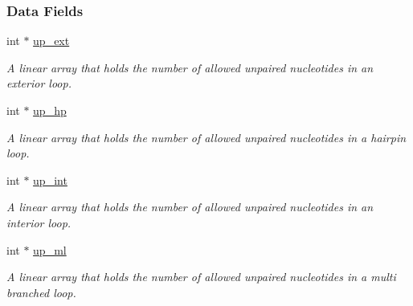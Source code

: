 \subsubsection*{Data Fields}
\begin{DoxyCompactItemize}
\item 
\mbox{\label{group__hard__constraints_a60094038af04093b2fee9b883266ff75}} 
int $\ast$ \hyperlink{group__hard__constraints_a60094038af04093b2fee9b883266ff75}{up\+\_\+ext}
\begin{DoxyCompactList}\small\item\em A linear array that holds the number of allowed unpaired nucleotides in an exterior loop. \end{DoxyCompactList}\item 
\mbox{\label{group__hard__constraints_a853255558e7e7d9eb382ac142ac8de3d}} 
int $\ast$ \hyperlink{group__hard__constraints_a853255558e7e7d9eb382ac142ac8de3d}{up\+\_\+hp}
\begin{DoxyCompactList}\small\item\em A linear array that holds the number of allowed unpaired nucleotides in a hairpin loop. \end{DoxyCompactList}\item 
\mbox{\label{group__hard__constraints_a455f994af0ec892d84fee1bf60d14a81}} 
int $\ast$ \hyperlink{group__hard__constraints_a455f994af0ec892d84fee1bf60d14a81}{up\+\_\+int}
\begin{DoxyCompactList}\small\item\em A linear array that holds the number of allowed unpaired nucleotides in an interior loop. \end{DoxyCompactList}\item 
\mbox{\label{group__hard__constraints_aa318079c2e3cfaca8dc589cc478d3b29}} 
int $\ast$ \hyperlink{group__hard__constraints_aa318079c2e3cfaca8dc589cc478d3b29}{up\+\_\+ml}
\begin{DoxyCompactList}\small\item\em A linear array that holds the number of allowed unpaired nucleotides in a multi branched loop. \end{DoxyCompactList}\item 
\mbox{\label{group__hard__constraints_a85714afbf27012165ec80c564bd62931}} 

\end{DoxyCompactItemize}
